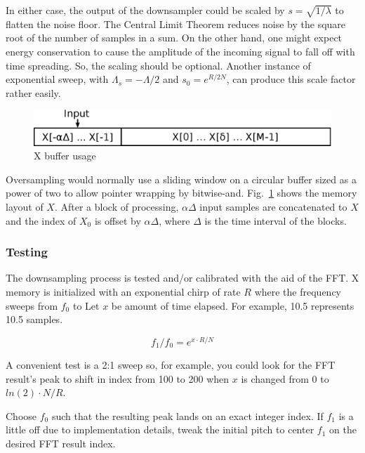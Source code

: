 In either case, the output of the downsampler could be scaled by
$s=\sqrt{1/\lambda}$ to flatten the noise floor.
The Central Limit Theorem reduces noise
by the square root of the number of samples in a sum.
On the other hand, one might expect energy conservation to cause the
amplitude of the incoming signal to fall off with time spreading.
So, the scaling should be optional.
Another instance of exponential sweep, with $\Lambda_s = -\Lambda/2$
and $s_0 = e^{R/2N}$,
can produce this scale factor rather easily.

\begin{figure}
	\centering
	\includegraphics[width=0.95\linewidth]{../source/xbuf_e}
	\caption[X buffer usage]{X buffer usage}
	\label{fig:xbuf}
\end{figure}

Oversampling would normally use a sliding window on a circular buffer sized as
a power of two to allow pointer wrapping by bitwise-and.
Fig.~\ref{fig:xbuf} shows the memory layout of $X$.
After a block of processing, $\alpha\Delta$ input samples are concatenated to
$X$ and the index of $X_0$ is offset by $\alpha\Delta$,
where $\Delta$ is the time interval of the blocks.

\subsubsection{Testing}

The downsampling process is tested and/or calibrated with the aid of the FFT.
X memory is initialized with an exponential chirp of rate $R$ where
the frequency sweeps from $f_0$ to %
Let $x$ be amount of time elapsed. For example, 10.5 represents 10.5 samples.

\begin{equation}
f_1/f_0 = e^{x \cdot R / N}
\end{equation}

A convenient test is a 2:1 sweep so, for example, you could look for the FFT
result's peak to shift in index from 100 to 200 when $x$ is changed from $0$
to $ln(2) \cdot N / R$.

Choose $f_0$ such that the resulting peak lands on an exact integer index.
If $f_1$ is a little off due to implementation details,
tweak the initial pitch to center $f_1$ on the desired FFT result index.

